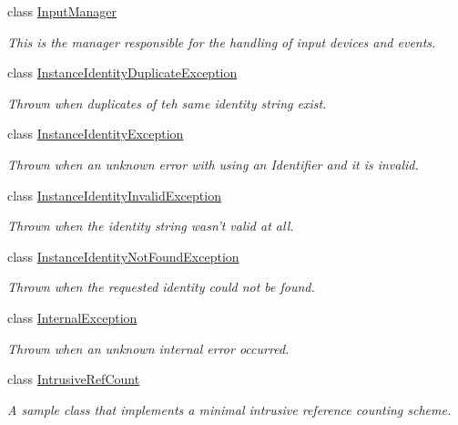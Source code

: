 \begin{DoxyCompactItemize}
class \hyperlink{classMezzanine_1_1InputManager}{Input\-Manager}
\begin{DoxyCompactList}\small\item\em This is the manager responsible for the handling of input devices and events. \end{DoxyCompactList}\item 
class \hyperlink{classMezzanine_1_1InstanceIdentityDuplicateException}{Instance\-Identity\-Duplicate\-Exception}
\begin{DoxyCompactList}\small\item\em Thrown when duplicates of teh same identity string exist. \end{DoxyCompactList}\item 
class \hyperlink{classMezzanine_1_1InstanceIdentityException}{Instance\-Identity\-Exception}
\begin{DoxyCompactList}\small\item\em Thrown when an unknown error with using an Identifier and it is invalid. \end{DoxyCompactList}\item 
class \hyperlink{classMezzanine_1_1InstanceIdentityInvalidException}{Instance\-Identity\-Invalid\-Exception}
\begin{DoxyCompactList}\small\item\em Thrown when the identity string wasn't valid at all. \end{DoxyCompactList}\item 
class \hyperlink{classMezzanine_1_1InstanceIdentityNotFoundException}{Instance\-Identity\-Not\-Found\-Exception}
\begin{DoxyCompactList}\small\item\em Thrown when the requested identity could not be found. \end{DoxyCompactList}\item 
class \hyperlink{classMezzanine_1_1InternalException}{Internal\-Exception}
\begin{DoxyCompactList}\small\item\em Thrown when an unknown internal error occurred. \end{DoxyCompactList}\item 
class \hyperlink{classMezzanine_1_1IntrusiveRefCount}{Intrusive\-Ref\-Count}
\begin{DoxyCompactList}\small\item\em A sample class that implements a minimal intrusive reference counting scheme. \end{DoxyCompactList}\item 

\end{DoxyCompactItemize}
